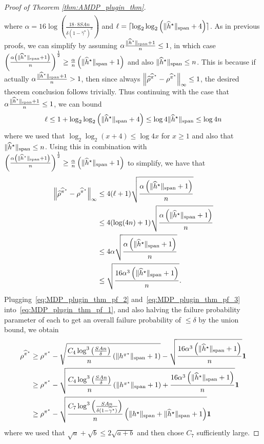 \documentclass{article}
\theoremstyle{plain}
\theoremstyle{plain}
\theoremstyle{remark}
\theoremstyle{plain}
\theoremstyle{plain}
\newcommand{\pistar}{\pi^\star}
\newcommand{\pihstar}{\widehat{\pi}^\star}
\newcommand{\one}{\mathbf{1}}
\newcommand{\rhohat}{\widehat{\rho}}
\newcommand{\hhat}{\widehat{h}}
\newcommand{\empbod}{\widehat{\gamma}^\star}
\begin{document}
\begin{proof}[Proof of Theorem \ref{thm:AMDP_plugin_thm}]
\begin{align*}
    \end{align*}
    where $\alpha = 16 \log \left(\frac{18\cdot 8 SA n }{ \delta (1-\empbod)^3}  \right)$ and $\ell = \lceil\log_2 \log_2 \left( \spannorm{\hhat^\star} + 4\right) \rceil$. As in previous proofs, we can simplify by assuming $\alpha\frac{ \spannorm{\hhat^\star}+1}{n} \leq 1$, in which case $ \left(\frac{\alpha \left(\spannorm{\hhat^\star} + 1\right)}{n} \right)^{ \frac{1}{2}} \geq \frac{\alpha   }{n}\left(\spannorm{\hhat^\star} + 1 \right)$ and also $\spannorm{\hhat^\star} \leq n$. This is because if actually $\alpha\frac{ \spannorm{\hhat^\star}+1}{n} > 1$, then since always $\infnorm{\rhohat^{\pihstar} - \rho^{\pihstar}} \leq 1$, the desired theorem conclusion follows trivially. Thus continuing with the case that $\alpha\frac{ \spannorm{\hhat^\star}+1}{n} \leq 1$, we can bound
    \[
        \ell \leq 1 + \log_2 \log_2 \left( \spannorm{\hhat^\star} + 4\right) \leq \log 4 \spannorm{\hhat^\star} \leq \log 4n 
    \]
    where we used that $\log_2 \log_2 (x+4) \leq \log 4x$ for $x \geq 1$ and also that $\spannorm{\hhat^\star} \leq n$. Using this in combination with $ \left(\frac{\alpha \left(\spannorm{\hhat^\star} + 1\right)}{n} \right)^{ \frac{1}{2}} \geq \frac{\alpha   }{n}\left(\spannorm{\hhat^\star} + 1 \right)$ to simplify, we have that
    \begin{align}
        \infnorm{\rhohat^{\pihstar} - \rho^{\pihstar}} & \leq 4 (\ell + 1) \sqrt{\frac{\alpha \left(\spannorm{\hhat^\star}+1 \right)}{n}}  \nonumber \\
        & \leq 4 (\log (4n) + 1) \sqrt{\frac{\alpha \left(\spannorm{\hhat^\star}+1 \right)}{n}} \nonumber \\
        & \leq 4\alpha \sqrt{\frac{\alpha \left(\spannorm{\hhat^\star}+1 \right)}{n}} \nonumber \\
        & \leq  \sqrt{\frac{16 \alpha^3 \left(\spannorm{\hhat^\star}+1 \right)}{n}} \label{eq:MDP_plugin_thm_pf_3}.
    \end{align}
    Plugging~\eqref{eq:MDP_plugin_thm_pf_2} and~\eqref{eq:MDP_plugin_thm_pf_3} into~\eqref{eq:MDP_plugin_thm_pf_1}, and also halving the failure probability parameter of each to get an overall failure probability of $\leq \delta$ by the union bound, we obtain
    \begin{align*}
        \rho^{\pihstar} & \geq \rho^{\pistar} - \sqrt{\frac{C_4 \log^3 \left( \frac{SAn}{\delta} \right)}{n} \left( \spannorm{h^{\pistar}}+1 \right)} -  \sqrt{\frac{16 \alpha^3 \left(\spannorm{\hhat^\star}+1 \right)}{n}}\one \\
        & \geq \rho^{\pistar} - \sqrt{\frac{C_4 \log^3 \left( \frac{SAn}{\delta} \right)}{n} \left( \spannorm{h^{\pistar}}+1 \right) + \frac{16 \alpha^3 \left(\spannorm{\hhat^\star}+1 \right)}{n}}\one \\
        & \geq \rho^{\pistar} -\sqrt{\frac{C_7 \log^3 \left( \frac{SAn}{\delta(1-\empbod)} \right)}{n} \left(\spannorm{h^\star} + \spannorm{\hhat^\star}+1 \right)}\one
    \end{align*}
    where we used that $\sqrt{a}+ \sqrt{b} \leq 2\sqrt{a + b}$ and then chose $C_7$ sufficiently large.
\end{proof}
\end{document}

